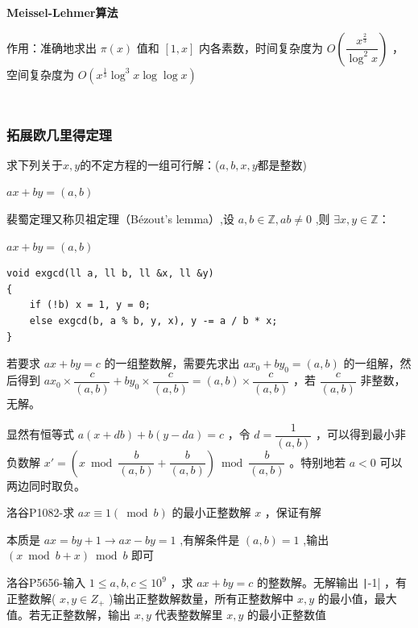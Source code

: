 \documentclass[twocolumn,10pt]{ctexart}
\makeatletter
\newcommand{\hfive}[1]{\par\addvspace{6pt}\@afterindentfalse
  {\noindent\bfseries\normalsize #1}\par\nobreak\vspace{2pt}}
\newcommand{\Z}{\mathbb{Z}}
\newcommand{\exist}{\exists}
\makeatother
\begin{document}
\hfive{Meissel-Lehmer算法}

作用：准确地求出 $\pi(x)$ 值和 $[1,x]$ 内各素数，时间复杂度为 $O(\dfrac{x^{\frac23}}{\log^2x})$ ，空间复杂度为 $O(x^\frac13\log^3x\log\log x)$

\inputminted{cpp}{code/meissel_lehmer.cpp}

\inputminted{cpp}{code/p7884_meissel_lehmer.cpp}

\subsubsection{拓展欧几里得定理}

求下列关于$x,y$的不定方程的一组可行解：($a,b,x,y$都是整数)

\begin{adjustbox}{max width=\linewidth,center}
$ax+by=(a,b)$
\end{adjustbox}

裴蜀定理又称贝祖定理（Bézout's lemma）,设 $a,b\in\Z,ab\neq0$ ,则 $\exist x,y\in\Z$：

\begin{adjustbox}{max width=\linewidth,center}
$ax+by=(a,b)$
\end{adjustbox}

\begin{verbatim}
void exgcd(ll a, ll b, ll &x, ll &y)
{
    if (!b) x = 1, y = 0;
    else exgcd(b, a % b, y, x), y -= a / b * x;
}
\end{verbatim}

若要求 $ax+by=c$ 的一组整数解，需要先求出 $ax_0+by_0=(a,b)$ 的一组解，然后得到 $ax_0\times\dfrac{c}{(a,\allowbreak{}b)}+by_0\times\dfrac{c}{(a,\allowbreak{}b)}=(a,\allowbreak{}b)\times\dfrac{c}{(a,\allowbreak{}b)}$ ，若 $\dfrac{c}{(a,b)}$ 非整数，无解。

显然有恒等式 $a(x+db)+b(y-da)=c$ ，令 $d=\dfrac1{(a,b)}$ ，可以得到最小非负数解 $x'=(x\bmod \dfrac b{(a,\allowbreak{}b)}+\dfrac b{(a,\allowbreak{}b)})\bmod \dfrac b{(a,\allowbreak{}b)}$ 。特别地若 $a<0$ 可以两边同时取负。

\begin{notebox}
洛谷P1082-求 $ax\equiv 1(\bmod b)$ 的最小正整数解 $x$ ，保证有解
\end{notebox}

本质是 $ax=by+1\to ax-by=1$ ,有解条件是 $(a,b)=1$ ,输出 $(x\bmod b+x)\bmod b$ 即可

\begin{notebox}
洛谷P5656-输入 $1\le a,b,c\le 10^9$ ，求 $ax+by=c$ 的整数解。无解输出 \texttt|-1| ，有正整数解( $x,y\in Z_+$ )输出正整数解数量，所有正整数解中 $x,y$ 的最小值，最大值。若无正整数解，输出 $x,y$ 代表整数解里 $x,y$ 的最小正整数值
\end{notebox}
\end{document}
